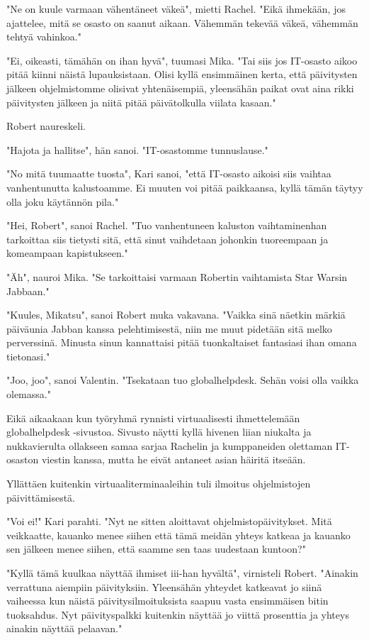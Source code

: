 "Ne on kuule varmaan vähentäneet väkeä", mietti Rachel. "Eikä ihmekään, jos ajattelee, mitä se osasto on saanut aikaan. Vähemmän tekevää väkeä, vähemmän tehtyä vahinkoa."


"Ei, oikeasti, tämähän on ihan hyvä", tuumasi Mika. "Tai siis jos IT-osasto aikoo pitää kiinni näistä lupauksistaan. Olisi kyllä ensimmäinen kerta, että päivitysten jälkeen ohjelmistomme olisivat yhtenäisempiä, yleensähän paikat ovat aina rikki päivitysten jälkeen ja niitä pitää päivätolkulla viilata kasaan."


Robert naureskeli.


"Hajota ja hallitse", hän sanoi. "IT-osastomme tunnuslause."


"No mitä tuumaatte tuosta", Kari sanoi, "että IT-osasto aikoisi siis vaihtaa vanhentunutta kalustoamme. Ei muuten voi pitää paikkaansa, kyllä tämän täytyy olla joku käytännön pila."


"Hei, Robert", sanoi Rachel. "Tuo vanhentuneen kaluston vaihtaminenhan tarkoittaa siis tietysti sitä, että sinut vaihdetaan johonkin tuoreempaan ja komeampaan kapistukseen."


"Äh", nauroi Mika. "Se tarkoittaisi varmaan Robertin vaihtamista Star Warsin Jabbaan."


"Kuules, Mikatsu", sanoi Robert muka vakavana. "Vaikka sinä näetkin märkiä päiväunia Jabban kanssa pelehtimisestä, niin me muut pidetään sitä melko perverssinä. Minusta sinun kannattaisi pitää tuonkaltaiset fantasiasi ihan omana tietonasi."


"Joo, joo", sanoi Valentin. "Tsekataan tuo globalhelpdesk. Sehän voisi olla vaikka olemassa."


Eikä aikaakaan kun työryhmä rynnisti virtuaalisesti ihmettelemään globalhelpdesk -sivustoa. Sivusto näytti kyllä hivenen liian niukalta ja nukkavierulta ollakseen samaa sarjaa Rachelin ja kumppaneiden olettaman IT-osaston viestin kanssa, mutta he eivät antaneet asian häiritä itseään.


Yllättäen kuitenkin virtuaaliterminaaleihin tuli ilmoitus ohjelmistojen päivittämisestä.


"Voi ei!" Kari parahti. "Nyt ne sitten aloittavat ohjelmistopäivitykset. Mitä veikkaatte, kauanko menee siihen että tämä meidän yhteys katkeaa ja kauanko sen jälkeen menee siihen, että saamme sen taas uudestaan kuntoon?"


"Kyllä tämä kuulkaa näyttää ihmiset iii-han hyvältä", virnisteli Robert. "Ainakin verrattuna aiempiin päivityksiin. Yleensähän yhteydet katkeavat jo siinä vaiheessa kun näistä päivitysilmoituksista saapuu vasta ensimmäisen bitin tuoksahdus. Nyt päivityspalkki kuitenkin näyttää jo viittä prosenttia ja yhteys ainakin näyttää pelaavan."


